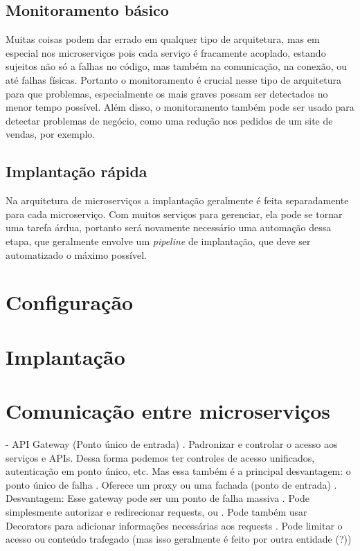 \subsection{Monitoramento básico}

Muitas coisas podem dar errado em qualquer tipo de arquitetura, mas em especial nos microserviços pois cada serviço é fracamente acoplado, estando sujeitos não só a falhas no código, mas também na comunicação, na conexão, ou até falhas físicas. Portanto o monitoramento é crucial nesse tipo de arquitetura para que problemas, especialmente os mais graves possam ser detectados no menor tempo possível. Além disso, o monitoramento também pode ser usado para detectar problemas de negócio, como uma redução nos pedidos de um site de vendas, por exemplo. \cite{MartinFowlerMicroservices}

\subsection{Implantação rápida}

Na arquitetura de microserviços a implantação geralmente é feita separadamente para cada microserviço. Com muitos serviços para gerenciar, ela pode se tornar uma tarefa árdua, portanto será novamente necessário uma automação dessa etapa, que geralmente envolve um \emph{pipeline} de implantação, que deve ser automatizado o máximo possível. \cite{MartinFowlerMicroservices}

\section{Configuração}

\section{Implantação}

\section{Comunicação entre microserviços}

- API Gateway (Ponto único de entrada)
    . Padronizar e controlar o acesso aos serviços e APIs. Dessa forma podemos ter controles de acesso unificados, autenticação em ponto único, etc. Mas essa também é a principal desvantagem: o ponto único de falha
    . Oferece um proxy ou uma fachada (ponto de entrada)
    . Desvantagem: Esse gateway pode ser um ponto de falha massiva
    . Pode simplesmente autorizar e redirecionar requests, ou
    . Pode também usar Decorators para adicionar informações necessárias aos requests
    . Pode limitar o acesso ou conteúdo trafegado (mas isso geralmente é feito por outra entidade (?))

